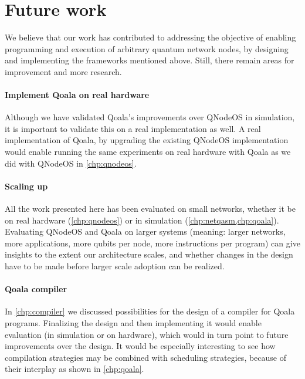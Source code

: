 \section{Future work}
We believe that our work has contributed to addressing the objective of enabling programming and execution of arbitrary quantum network nodes, by designing and implementing the frameworks mentioned above.
Still, there remain areas for improvement and more research.

\paragraph{Implement Qoala on real hardware}
Although we have validated Qoala's improvements over QNodeOS in simulation, it is important to validate this on a real implementation as well.
A real implementation of Qoala, by upgrading the existing QNodeOS implementation would enable running the same experiments on real hardware with Qoala as we did with QNodeOS in \cref{chp:qnodeos}.


\paragraph{Scaling up}
All the work presented here has been evaluated on small networks, whether it be on real hardware (\cref{chp:qnodeos}) or in simulation (\cref{chp:netqasm,chp:qoala}).
Evaluating QNodeOS and Qoala on larger systems (meaning: larger networks, more applications, more qubits per node, more instructions per program) can give insights to the extent our architecture scales, and whether changes in the design have to be made before larger scale adoption can be realized.

\paragraph{Qoala compiler}
In \cref{chp:compiler} we discussed possibilities for the design of a compiler for Qoala programs.
Finalizing the design and then implementing it would enable evaluation (in simulation or on hardware), which would in turn point to future improvements over the design.
It would be especially interesting to see how compilation strategies may be combined with scheduling strategies, because of their interplay as shown in \cref{chp:qoala}.

